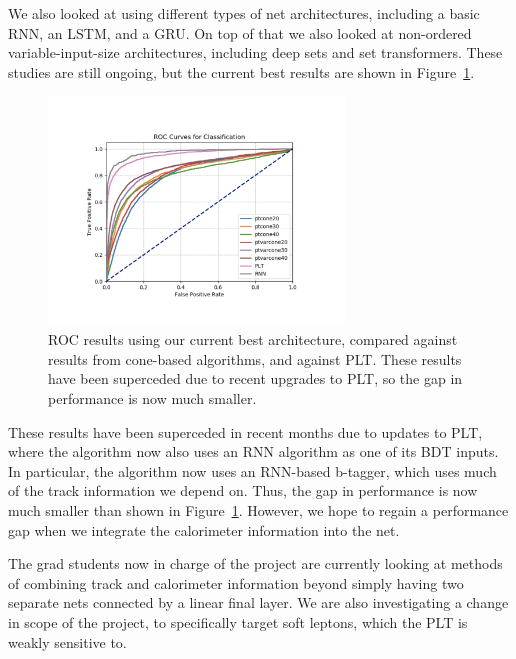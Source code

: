 We also looked at using different types of net architectures, including a basic RNN, an LSTM, and a GRU. On top of that we also looked at non-ordered variable-input-size architectures, including deep sets and set transformers. These studies are still ongoing, but the current best results are shown in Figure~\ref{fig:RNN_results}.

\begin{figure}[htbp]
    \centering
    \includegraphics[width=0.7\textwidth]{Images/RNN/ROC.pdf}
    \caption{ROC results using our current best architecture, compared against results from cone-based algorithms, and against PLT. These results have been superceded due to recent upgrades to PLT, so the gap in performance is now much smaller.}
    \label{fig:RNN_results}
\end{figure}

These results have been superceded in recent months due to updates to PLT, where the algorithm now also uses an RNN algorithm as one of its BDT inputs. In particular, the algorithm now uses an RNN-based b-tagger, which uses much of the track information we depend on. Thus, the gap in performance is now much smaller than shown in Figure~\ref{fig:RNN_results}. However, we hope to regain a performance gap when we integrate the calorimeter information into the net.

The grad students now in charge of the project are currently looking at methods of combining track and calorimeter information beyond simply having two separate nets connected by a linear final layer. We are also investigating a change in scope of the project, to specifically target soft leptons, which the PLT is weakly sensitive to.